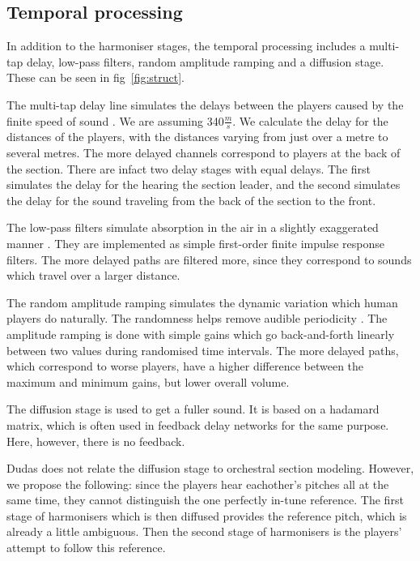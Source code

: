 \subsection{Temporal processing}
In addition to the harmoniser stages, the temporal processing includes a multi-tap delay, low-pass filters, random amplitude ramping and a diffusion stage. These can be seen in fig~\ref{fig:struct}. 


The multi-tap delay line simulates the delays between the players caused by the finite speed of sound \cite{dudas}. We are assuming 340$\frac{m}{s}$. We calculate the delay for the distances of the players, with the distances varying from just over a metre to several metres. The more delayed channels correspond to players at the back of the section. There are infact two delay stages with equal delays. The first simulates the delay for the hearing the section leader, and the second simulates the delay for the sound traveling from the back of the section to the front.


The low-pass filters simulate absorption in the air in a slightly exaggerated manner \cite{dudas}. They are implemented as simple first-order finite impulse response filters. The more delayed paths are filtered more, since they correspond to sounds which travel over a larger distance.

The random amplitude ramping simulates the dynamic variation which human players do naturally. The randomness helps remove audible periodicity \cite{dudas}. The amplitude ramping is done with simple gains which go back-and-forth linearly between two values during randomised time intervals. The more delayed paths, which correspond to worse players, have a higher difference between the maximum and minimum gains, but lower overall volume.

The diffusion stage is used to get a fuller sound. It is based on a hadamard matrix, which is often used in feedback delay networks for the same purpose. \cite{Jot} Here, however, there is no feedback.

Dudas does not relate the diffusion stage to orchestral section modeling. However, we propose the following: since the players hear eachother's pitches all at the same time, they cannot distinguish the one perfectly in-tune reference. The first stage of harmonisers which is then diffused provides the reference pitch, which is already a little ambiguous. Then the second stage of harmonisers is the players' attempt to follow this reference. 
